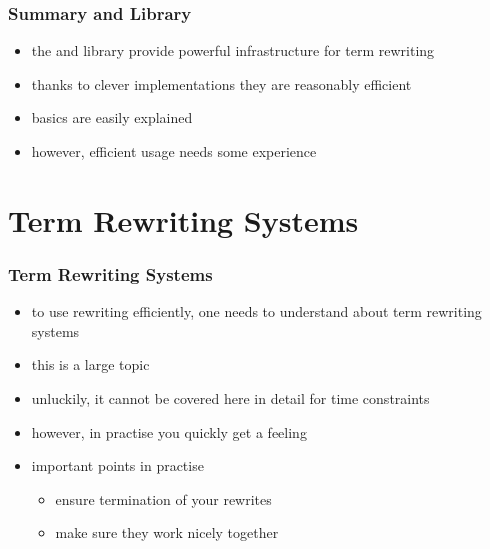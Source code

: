 \begin{frame}
\frametitle{Summary  and  Library}

\begin{itemize}
\item the  and  library provide powerful infrastructure for term rewriting
\item thanks to clever implementations they are reasonably efficient
\item basics are easily explained
\item however, efficient usage needs some experience
\end{itemize}
\end{frame}


\section{Term Rewriting Systems}

\begin{frame}
\frametitle{Term Rewriting Systems}

\begin{itemize}
\item to use rewriting efficiently, one needs to understand about term rewriting systems
\item this is a large topic
\item unluckily, it cannot be covered here in detail for time constraints
\item however, in practise you quickly get a feeling
\item important points in practise
\begin{itemize}
\item ensure termination of your rewrites
\item make sure they work nicely together
\end{itemize} 
\end{itemize}
\end{frame}

